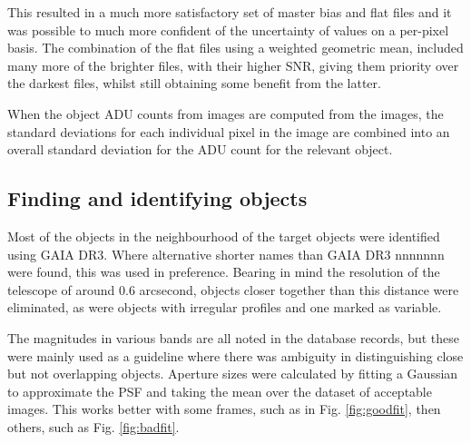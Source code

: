 This resulted in a much more satisfactory set of master bias and flat files and
it was possible to much more confident of the uncertainty of values on a
per-pixel basis. The combination of the flat files using a weighted
geometric mean, included many more of the brighter files, with their higher
SNR, giving them priority over the darkest files, whilst still obtaining some
benefit from the latter.

When the object ADU counts from {\rem} images are computed from the images, the
standard deviations for each individual pixel in the image are combined into an
overall standard deviation for the ADU count for the relevant object.

\subsection{Finding and identifying objects}
\protect\label{section:findingidentify}

Most of the objects in the neighbourhood of the target {\rdwarf} objects were
identified using GAIA DR3. Where alternative shorter names than GAIA DR3 nnnnnnn
were found, this was used in preference. Bearing in mind the resolution of the
{\rem} telescope of around 0.6 arcsecond, objects closer together than this
distance were eliminated, as were objects with irregular profiles and one marked
as variable.

The magnitudes in various bands are all noted in the database records, but these
were mainly used as a guideline where there was ambiguity in distinguishing
close but not overlapping objects. Aperture sizes were calculated by fitting a
Gaussian to approximate the PSF and taking the mean over the dataset of
acceptable images. This works better with some frames, such as in Fig.
\ref{fig:goodfit}, then others, such as Fig. \ref{fig:badfit}.

